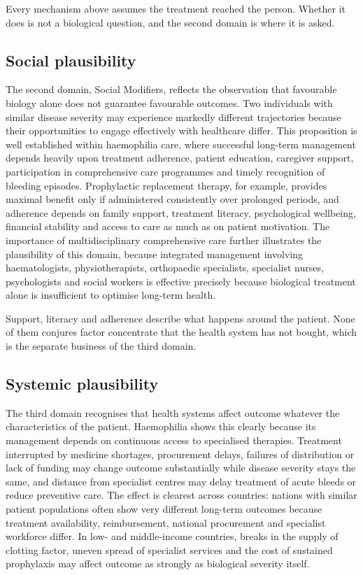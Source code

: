 Every mechanism above assumes the treatment reached the person. Whether it
does is not a biological question, and the second domain is where it is asked.

\subsection{Social plausibility}

The second domain, Social Modifiers, reflects the observation that favourable biology alone does not guarantee favourable outcomes. Two individuals with similar disease severity may experience markedly different trajectories because their opportunities to engage effectively with healthcare differ. This proposition is well established within haemophilia care, where successful long-term management depends heavily upon treatment adherence, patient education, caregiver support, participation in comprehensive care programmes and timely recognition of bleeding episodes. Prophylactic replacement therapy, for example, provides maximal benefit only if administered consistently over prolonged periods, and adherence depends on family support, treatment literacy, psychological wellbeing, financial stability and access to care as much as on patient motivation. The importance of multidisciplinary comprehensive care further illustrates the plausibility of this domain, because integrated management involving haematologists, physiotherapists, orthopaedic specialists, specialist nurses, psychologists and social workers is effective precisely because biological treatment alone is insufficient to optimise long-term health.

Support, literacy and adherence describe what happens around the patient.
None of them conjures factor concentrate that the health system has not bought,
which is the separate business of the third domain.

\subsection{Systemic plausibility}

The third domain recognises that health systems affect outcome whatever the characteristics of the patient. Haemophilia shows this clearly because its management depends on continuous access to specialised therapies. Treatment interrupted by medicine shortages, procurement delays, failures of distribution or lack of funding may change outcome substantially while disease severity stays the same, and distance from specialist centres may delay treatment of acute bleeds or reduce preventive care. The effect is clearest across countries: nations with similar patient populations often show very different long-term outcomes because treatment availability, reimbursement, national procurement and specialist workforce differ. In low- and middle-income countries, breaks in the supply of clotting factor, uneven spread of specialist services and the cost of sustained prophylaxis may affect outcome as strongly as biological severity itself.

